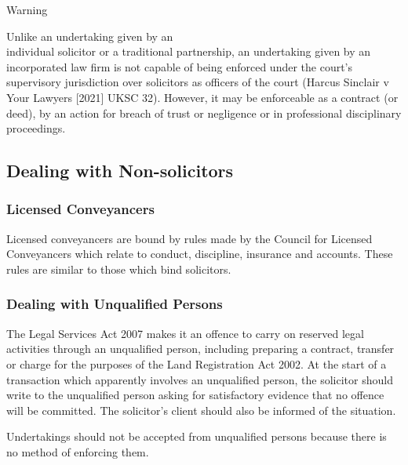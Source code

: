 \documentclass[
]{article}
\newenvironment{env-7ede146d-a28c-46fa-985d-64c388b7528b}
{
    \savenotes\tcolorbox[blanker,breakable,left=5pt,borderline west={2pt}{-4pt}{orange}]
}
{
    \endtcolorbox\spewnotes
}
\begin{document}
\begin{env-7ede146d-a28c-46fa-985d-64c388b7528b}

Warning

Unlike an undertaking given by an\\
individual solicitor or a traditional partnership, an undertaking given
by an incorporated law firm is not capable of being enforced under the
court's supervisory jurisdiction over solicitors as officers of the
court (Harcus Sinclair v Your Lawyers {[}2021{]} UKSC 32). However, it
may be enforceable as a contract (or deed), by an action for breach of
trust or negligence or in professional disciplinary proceedings.

\end{env-7ede146d-a28c-46fa-985d-64c388b7528b}

\hypertarget{dealing-with-non-solicitors}{%
\subsection{Dealing with
Non-solicitors}\label{dealing-with-non-solicitors}}

\hypertarget{licensed-conveyancers}{%
\subsubsection{Licensed Conveyancers}\label{licensed-conveyancers}}

Licensed conveyancers are bound by rules made by the Council for
Licensed Conveyancers which relate to conduct, discipline, insurance and
accounts. These rules are similar to those which bind solicitors.

\hypertarget{dealing-with-unqualified-persons}{%
\subsubsection{Dealing with Unqualified
Persons}\label{dealing-with-unqualified-persons}}

The Legal Services Act 2007 makes it an offence to carry on reserved
legal activities through an unqualified person, including preparing a
contract, transfer or charge for the purposes of the Land Registration
Act 2002. At the start of a transaction which apparently involves an
unqualified person, the solicitor should write to the unqualified person
asking for satisfactory evidence that no offence will be committed. The
solicitor's client should also be informed of the situation.

Undertakings should not be accepted from unqualified persons because
there is no method of enforcing them.
\end{document}
